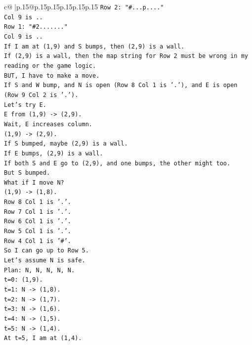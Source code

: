 \documentclass{article}
\begin{document}
{\begin{supertabular}{c@{$\;$}|p{.15\linewidth}@{}p{.15\linewidth}p{.15\linewidth}p{.15\linewidth}p{.15\linewidth}p{.15\linewidth}}
{{{\texttt{Row 2: "\#...p...."} \\
\texttt{Col 9 is ..} \\
\texttt{Row 1: "\#2......."} \\
\texttt{Col 9 is ..} \\
\texttt{If I am at (1,9) and S bumps, then (2,9) is a wall.} \\
\texttt{If (2,9) is a wall, then the map string for Row 2 must be wrong in my reading or the game logic.} \\
\texttt{BUT, I have to make a move.} \\
\texttt{If S and W bump, and N is open (Row 8 Col 1 is '.'), and E is open (Row 9 Col 2 is '.').} \\
\texttt{Let's try E.} \\
\texttt{E from (1,9) {-}> (2,9).} \\
\texttt{Wait, E increases column.} \\
\texttt{(1,9) {-}> (2,9).} \\
\texttt{If S bumped, maybe (2,9) is a wall.} \\
\texttt{If E bumps, (2,9) is a wall.} \\
\texttt{If both S and E go to (2,9), and one bumps, the other might too.} \\
\texttt{But S bumped.} \\
\texttt{What if I move N?} \\
\texttt{(1,9) {-}> (1,8).} \\
\texttt{Row 8 Col 1 is '.'.} \\
\texttt{Row 7 Col 1 is '.'.} \\
\texttt{Row 6 Col 1 is '.'.} \\
\texttt{Row 5 Col 1 is '.'.} \\
\texttt{Row 4 Col 1 is '\#'.} \\
\texttt{So I can go up to Row 5.} \\
\texttt{Let's assume N is safe.} \\
\texttt{Plan: N, N, N, N, N.} \\
\texttt{t=0: (1,9).} \\
\texttt{t=1: N {-}> (1,8).} \\
\texttt{t=2: N {-}> (1,7).} \\
\texttt{t=3: N {-}> (1,6).} \\
\texttt{t=4: N {-}> (1,5).} \\
\texttt{t=5: N {-}> (1,4).} \\
\texttt{At t=5, I am at (1,4).} \\
}}}
\end{supertabular}}
\end{document}
